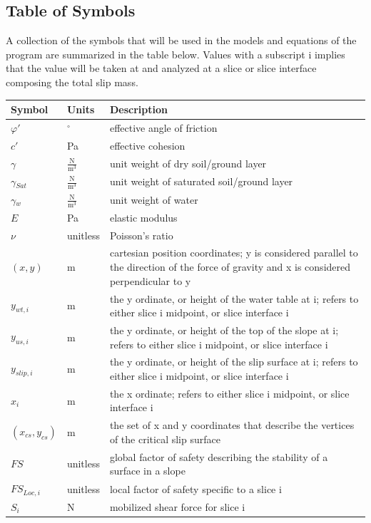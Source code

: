 \documentclass[12pt]{article}
\begin{document}
\subsection{Table of Symbols}
\label{Sec:ToS}
A collection of the symbols that will be used in the models and equations of the program are summarized in the table below. Values with a subscript i implies that the value will be taken at and analyzed at a slice or slice interface composing the total slip mass.
\begin{longtable*}{l l l}
\toprule
Symbol & Units & Description
\\
\midrule
$\varphi{}'$ & ${}^{\circ}$ & effective angle of friction
\\
$c'$ & Pa & effective cohesion
\\
$\gamma{}$ & $\frac{\text{N}}{\text{m}^{3}}$ & unit weight of dry soil/ground layer
\\
$\gamma{}_{Sat}$ & $\frac{\text{N}}{\text{m}^{3}}$ & unit weight of saturated soil/ground layer
\\
$\gamma{}_{w}$ & $\frac{\text{N}}{\text{m}^{3}}$ & unit weight of water
\\
$E$ & Pa & elastic modulus
\\
$\nu{}$ & unitless & Poisson's ratio
\\
$(x,y)$ & m & cartesian position coordinates; y is considered parallel to the direction of the force of gravity and x is considered perpendicular to y
\\
$y_{wt,i}$ & m & the y ordinate, or height of the water table at i; refers to either slice i midpoint, or slice interface i
\\
$y_{us,i}$ & m & the y ordinate, or height of the top of the slope at i; refers to either slice i midpoint, or slice interface i
\\
$y_{slip,i}$ & m & the y ordinate, or height of the slip surface at i; refers to either slice i midpoint, or slice interface i
\\
$x_{i}$ & m & the x ordinate; refers to either slice i midpoint, or slice interface i
\\
$({x_{cs}},{y_{cs}})$ & m & the set of x and y coordinates that describe the vertices of the critical slip surface
\\
$FS$ & unitless & global factor of safety describing the stability of a surface in a slope
\\
$FS_{Loc,i}$ & unitless & local factor of safety specific to a slice i
\\
$S_{i}$ & N & mobilized shear force for slice i

\end{longtable*}
\end{document}
